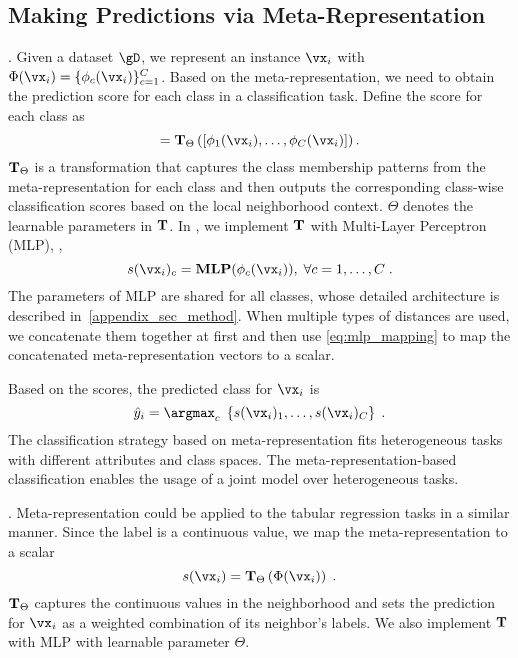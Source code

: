\subsection{Making Predictions via Meta-Representation}
. Given a dataset $\gD$, we represent an instance $\vx_i$ with $\Phi(\vx_i)=\{\phi_c(\vx_i)\}_{c=1}^C$. Based on the meta-representation, we need to obtain the prediction score for each class in a classification task.
Define the score for each class as 
\begin{equation}
[s(\vx_i)_1,\ldots,s(\vx_i)_C] = {\bf T}_{\Theta}\left([\phi_1(\vx_i), \ldots, \phi_C(\vx_i)]\right).\label{eq:transformation}
\end{equation}
${\bf T}_{\Theta}$ is a transformation that captures the class membership patterns from the meta-representation for each class and then outputs the corresponding class-wise classification scores based on the local neighborhood context. ${\Theta}$ denotes the learnable parameters in ${\bf T}$. In \ours, we implement ${\bf T}$ with Multi-Layer Perceptron (MLP), \ie, 
\begin{equation}
    s(\vx_i)_c = {\bf MLP}(\phi_c(\vx_i)),\;\forall c=1,\ldots,C\;. \label{eq:mlp_mapping}
\end{equation}
The parameters of MLP are shared for all classes, whose detailed architecture is described in~\autoref{appendix_sec_method}.
When multiple types of distances are used, we concatenate them together at first and then use \autoref{eq:mlp_mapping} to map the concatenated meta-representation vectors to a scalar. 

Based on the scores, the predicted class for $\vx_i$ is 
\begin{equation}
    \hat{y}_i = \argmax_c\; \left\{s(\vx_i)_1,\ldots,s(\vx_i)_C\right\}\;.\label{eq:prediction}
\end{equation}
The classification strategy based on meta-representation fits heterogeneous tasks with different attributes and class spaces.
The meta-representation-based classification enables the usage of a joint model over heterogeneous tasks.

. Meta-representation could be applied to the tabular regression tasks in a similar manner. Since the label is a continuous value, we map the meta-representation to a scalar
\begin{equation}
    s(\vx_i) = {\bf T}_{\Theta}\left(\Phi(\vx_i)\right)\;.\label{eq:transformation_reg}
\end{equation}
${\bf T}_{\Theta}$ captures the continuous values in the neighborhood and sets the prediction for $\vx_i$ as a weighted combination of its neighbor's labels. 
We also implement ${\bf T}$ with MLP with learnable parameter ${\Theta}$.

